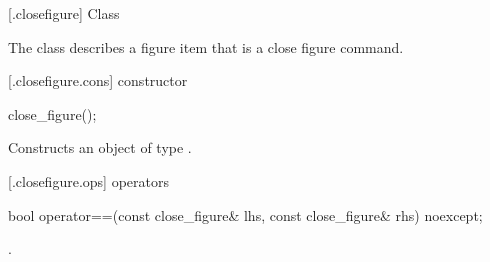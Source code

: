  [\iotwod.closefigure] {Class }%

\pnum
{}
The class  describes a figure item that is a close figure command.

 [\iotwod.closefigure.cons] { constructor}%

%
\begin{itemdecl}
close_figure();
\end{itemdecl}
\begin{itemdescr}
\pnum
\effects
Constructs an object of type .
\end{itemdescr}

 [\iotwod.closefigure.ops]{ operators}%

%
\begin{itemdecl}
bool operator==(const close_figure& lhs, const close_figure& rhs) noexcept;
\end{itemdecl}
\begin{itemdescr}
\pnum
\returns
{}.
\end{itemdescr}

